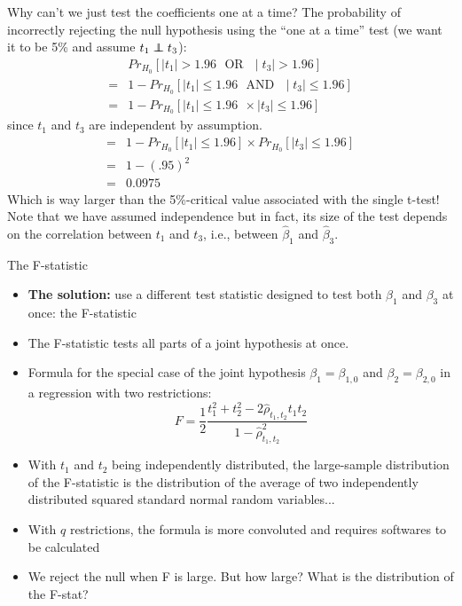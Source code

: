 \documentclass[notes,10pt, aspectratio=169]{beamer}
\newcommand\independent{\protect\mathpalette{\protect\independenT}{\perp}}
\def\independenT#1#2{\mathrel{\rlap{$#1#2$}\mkern2mu{#1#2}}}
\begin{document}
\begin{frame}{Why can’t we just test the coefficients one at a time?}
The probability of incorrectly rejecting the null hypothesis using the ``one at a time'' test (we want it to be 5\% and assume $t_1 \independent  t_3$):
\begin{eqnarray*}
    &Pr_{H_0}[\mid t_1 \mid > 1.96 \text{~~OR~~} \mid t_3 \mid > 1.96]\\
    =&1-Pr_{H_0}[\mid t_1 \mid \leq 1.96 \text{~~AND~~} \mid t_3 \mid \leq 1.96]\\
    =&1-Pr_{H_0}[\mid t_1 \mid \leq 1.96~~\times \mid t_3 \mid \leq 1.96]
\end{eqnarray*}
since $t_1$ and $t_3$ are independent by assumption.
\begin{eqnarray*}
    =&1-Pr_{H_0}[\mid t_1 \mid \leq 1.96] \times Pr_{H_0}[\mid t_3 \mid \leq 1.96]\\
    =&1-(.95)^2\\
    =&0.0975
\end{eqnarray*}
Which is way larger than the 5\%-critical value associated with the single t-test!\\

Note that we have assumed independence but in fact, its size of the test depends on the correlation between $t_1$ and $t_3$, i.e., between $\hat{\beta}_1$ and $\hat{\beta}_3$.

\end{frame}

\begin{frame}{The F-statistic}
\begin{itemize}
    \item \textbf{The solution:} use a different test statistic designed to test both ${\beta}_1$ and ${\beta}_3$ at once: the F-statistic
    \item The F-statistic tests all parts of a joint hypothesis at once.
    \item Formula for the special case of the joint hypothesis ${\beta}_1={\beta}_{1,0}$ and ${\beta}_2={\beta}_{2,0}$ in a regression with two restrictions:
    \begin{equation*}
        F=\frac{1}{2}\frac{t^2_1+t^2_2-2\hat{\rho}_{t_1, t_2}t_1t_2}{1-\hat{\rho}^2_{t_1, t_2}}
    \end{equation*}
    \item With $t_1$ and $t_2$ being independently distributed, the large-sample distribution of the F-statistic is the distribution of the average of two independently distributed squared standard normal random variables...
    \item With $q$ restrictions, the formula is more convoluted and requires softwares to be calculated
    \item We reject the null when F is large. But how large? What is the distribution of the F-stat?
\end{itemize}

\end{frame}
\end{document}
